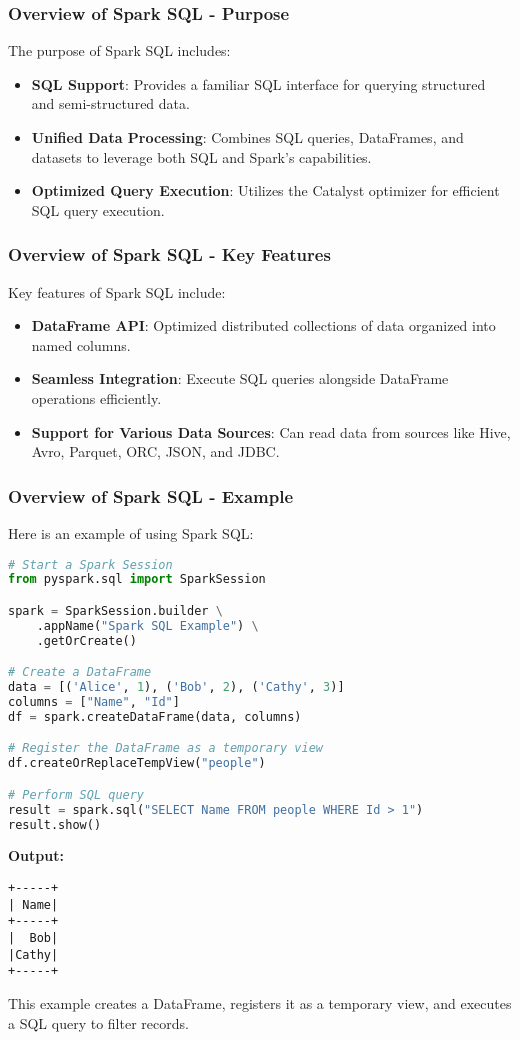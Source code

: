 \documentclass{beamer}
\begin{document}
\begin{frame}[fragile]
    \frametitle{Overview of Spark SQL - Purpose}
    The purpose of Spark SQL includes:
    \begin{itemize}
        \item \textbf{SQL Support}: Provides a familiar SQL interface for querying structured and semi-structured data.
        \item \textbf{Unified Data Processing}: Combines SQL queries, DataFrames, and datasets to leverage both SQL and Spark’s capabilities.
        \item \textbf{Optimized Query Execution}: Utilizes the Catalyst optimizer for efficient SQL query execution.
    \end{itemize}
\end{frame}

\begin{frame}[fragile]
    \frametitle{Overview of Spark SQL - Key Features}
    Key features of Spark SQL include:
    \begin{itemize}
        \item \textbf{DataFrame API}: Optimized distributed collections of data organized into named columns.
        \item \textbf{Seamless Integration}: Execute SQL queries alongside DataFrame operations efficiently.
        \item \textbf{Support for Various Data Sources}: Can read data from sources like Hive, Avro, Parquet, ORC, JSON, and JDBC.
    \end{itemize}
\end{frame}

\begin{frame}[fragile]
    \frametitle{Overview of Spark SQL - Example}
    Here is an example of using Spark SQL:
    \begin{lstlisting}[language=Python]
# Start a Spark Session
from pyspark.sql import SparkSession

spark = SparkSession.builder \
    .appName("Spark SQL Example") \
    .getOrCreate()

# Create a DataFrame
data = [('Alice', 1), ('Bob', 2), ('Cathy', 3)]
columns = ["Name", "Id"]
df = spark.createDataFrame(data, columns)

# Register the DataFrame as a temporary view
df.createOrReplaceTempView("people")

# Perform SQL query
result = spark.sql("SELECT Name FROM people WHERE Id > 1")
result.show()
    \end{lstlisting}

    \textbf{Output:}
    \begin{verbatim}
+-----+
| Name|
+-----+
|  Bob|
|Cathy|
+-----+
    \end{verbatim}
    This example creates a DataFrame, registers it as a temporary view, and executes a SQL query to filter records.
\end{frame}
\end{document}
